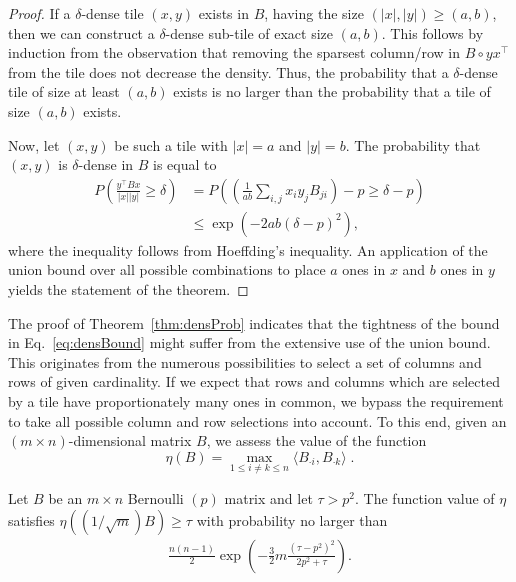 \begin{proof}
If a $\delta$-dense tile $(x,y)$ exists in $B$, having the size  $(|x|,|y|)\geq (a,b)$, then we can construct a $\delta$-dense sub-tile of exact size $(a,b)$. This follows by induction from the observation that removing the sparsest column/row in $B\circ yx^\top$ from the tile does not decrease the density. Thus, the probability that a $\delta$-dense tile of size at least $(a,b)$ exists is no larger than the probability that a tile of size $(a,b)$ exists.  

Now, let $(x,y)$ be such a tile with $|x|= a$ and $|y|= b$. The probability that $(x,y)$ is $\delta$-dense in $B$ is equal to
\begin{align*}
P\left(\frac{y^\top Bx}{|x||y|}\geq \delta\right)
&=P\left(\left(\frac{1}{ab}\sum_{i,j}x_iy_jB_{ji}\right)-p\geq \delta-p\right)\\
&\leq \exp(-2ab(\delta-p)^2),
\end{align*}
where the inequality follows from Hoeffding's inequality.
An application of the union bound over all possible combinations to place $a$ ones in $x$ and $b$ ones in $y$ yields the statement of the theorem.
\end{proof}
The proof of Theorem~\ref{thm:densProb} indicates that the tightness of the bound in Eq.~\eqref{eq:densBound} might suffer from the extensive use of the union bound. This originates from the numerous possibilities to select a set of columns and rows of given cardinality. If we expect that rows and columns which are selected by a tile have proportionately many ones in common, we bypass the requirement to take all possible column and row selections into account. To this end, given an $(m\times n)$-dimensional matrix $B$, we assess the value of the function 
\[
\eta(B)= \max_{1\leq i\neq k\leq n} \langle B_{\cdot i},B_{\cdot k}\rangle\;.
\] 
\begin{theorem}\label{thm:cohBound}
Let $B$ be an $m\times n$ Bernoulli $(p)$ matrix and let $\tau>p^2$. The function value of $\eta$ satisfies
$
\eta\left(({1}/\sqrt{m})B\right) \geq \tau
$
with probability no larger than
\begin{align}\label{eq:cohBound}  
\frac{n(n-1)}{2}\exp\left( -\frac{3}{2}m\frac{(\tau-p^2)^2}{2p^2+\tau}\right). 
\end{align}
\end{theorem}
%
